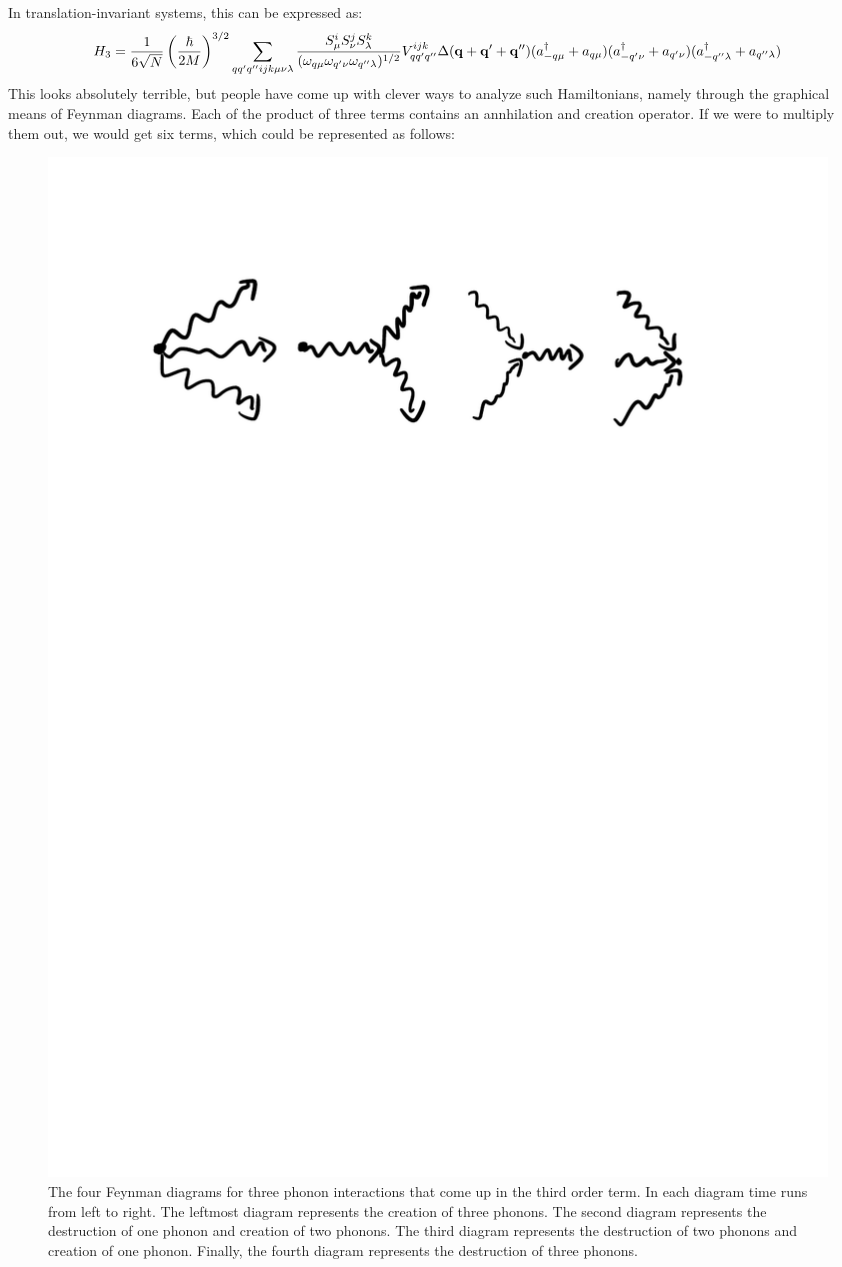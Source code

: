 In translation-invariant systems, this can be expressed as:
\begin{equation}
    H_3 = \frac{1}{6\sqrt{N}}\left(\frac{\hbar}{2M}\right)^{3/2}\sum_{qq'q''ijk\mu\nu\lambda}\frac{S_\mu^i S_\nu^j S_\lambda^k}{(\omega_{q\mu}\omega_{q'\nu}\omega_{q''\lambda})^{1/2}}V^{ijk}_{qq'q''}\Delta (\mathbf{q} + \mathbf{q}' + \mathbf{q}'') (a_{-q\mu}^\dagger + a_{q\mu})(a^\dagger_{-q'\nu} + a_{q'\nu})(a^\dagger_{-q''\lambda} + a_{q''\lambda})
\end{equation}
This looks absolutely terrible, but people have come up with clever ways to analyze such Hamiltonians, namely through the graphical means of Feynman diagrams. Each of the product of three terms contains an annhilation and creation operator. If we were to multiply them out, we would get six terms, which could be represented as follows:


\begin{figure}[htbp]
    \centering
    \includegraphics[scale=0.7]{Images/fig-threephonondiagrams.pdf}
    
    \caption{The four Feynman diagrams for three phonon interactions that come up in the third order term. In each diagram time runs from left to right. The leftmost diagram represents the creation of three phonons. The second diagram represents the destruction of one phonon and creation of two phonons. The third diagram represents the destruction of two phonons and creation of one phonon. Finally, the fourth diagram represents the destruction of three phonons.}
    \label{fig-threephonondiagrams}
\end{figure}

